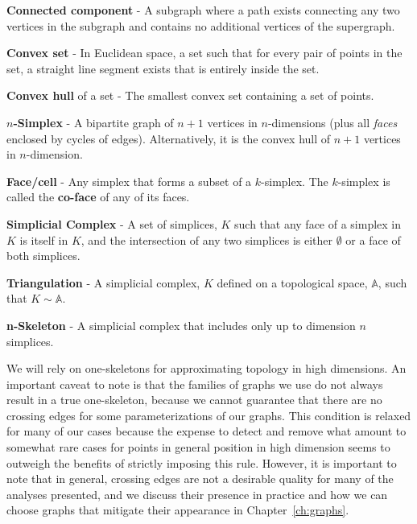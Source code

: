 \begin{defn}
  \textbf{Connected component} - A subgraph where a path exists connecting
  any two vertices in the subgraph and contains no additional vertices of the
  supergraph.
\end{defn}

\begin{defn}
  \textbf{Convex set} - In Euclidean space, a set such that for every pair of points in the set, a straight line segment exists that is entirely inside the set.
\end{defn}

\begin{defn}
  \textbf{Convex hull} of a set - The smallest convex set containing a set of points.
\end{defn}

\begin{defn}
  \textbf{$n$-Simplex} - A bipartite graph of $n+1$ vertices in $n$-dimensions
   (plus all \emph{faces} enclosed by cycles of edges).
  Alternatively, it is the convex hull of $n+1$ vertices in $n$-dimension.
\end{defn}

\begin{defn}
  \textbf{Face/cell} - Any simplex that forms a subset of a $k$-simplex.
  The $k$-simplex is called the \textbf{co-face} of any of its faces.
\end{defn}

\begin{defn}
  \textbf{Simplicial Complex} - A set of simplices, $K$ such that any face of
  a simplex in $K$ is itself in $K$, and the intersection of any two simplices
  is either $\emptyset$ or a face of both simplices.
\end{defn}

\begin{defn}
  \textbf{Triangulation} - A simplicial complex, $K$ defined on a topological
  space, $\mathbb{A}$, such that $K \sim \mathbb{A}$.
\end{defn}

\begin{defn}
  \textbf{n-Skeleton} - A simplicial complex that includes only up to dimension
  $n$ simplices.
\end{defn}

We will rely on one-skeletons for approximating topology in high dimensions.
%
An important caveat to note is that the families of graphs we use do not always result in a true one-skeleton, because we cannot guarantee that there are no crossing edges for some parameterizations of our graphs.
%
This condition is relaxed for many of our cases because the expense to detect and remove what amount to somewhat rare cases for points in general position in high dimension seems to outweigh the benefits of strictly imposing this rule.
%
However, it is important to note that in general, crossing edges are not a desirable quality for many of the analyses presented, and we discuss their presence in practice and how we can choose graphs that mitigate their appearance in Chapter~\ref{ch:graphs}.

